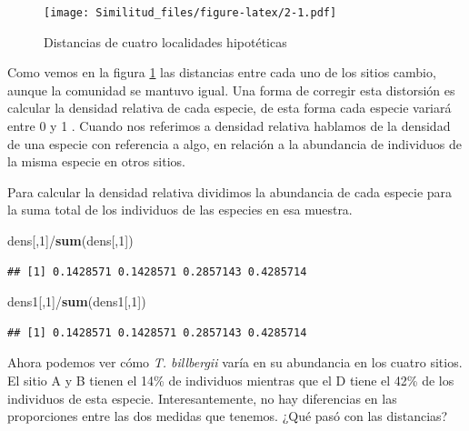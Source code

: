 \documentclass[]{book}
\newenvironment{Shaded}{\begin{snugshade}}{\end{snugshade}}
\newcommand{\KeywordTok}[1]{\textcolor[rgb]{0.13,0.29,0.53}{\textbf{{#1}}}}
\newcommand{\DecValTok}[1]{\textcolor[rgb]{0.00,0.00,0.81}{{#1}}}
\newcommand{\NormalTok}[1]{{#1}}
\begin{document}
\begin{figure}[htbp]
\centering
\texttt{[image: Similitud\_files/figure-latex/2-1.pdf]}
\caption{\label{fig:2}Distancias de cuatro localidades hipotéticas}
\end{figure}

Como vemos en la figura \ref{fig:2} las distancias entre cada uno de los
sitios cambio, aunque la comunidad se mantuvo igual. Una forma de
corregir esta distorsión es calcular la densidad relativa de cada
especie, de esta forma cada especie variará entre 0 y 1
\citep{Stevens2009}. Cuando nos referimos a densidad relativa hablamos
de la densidad de una especie con referencia a algo, en relación a la
abundancia de individuos de la misma especie en otros sitios.

Para calcular la densidad relativa dividimos la abundancia de cada
especie para la suma total de los individuos de las especies en esa
muestra.

\begin{Shaded}
\begin{Highlighting}[]
\NormalTok{dens[,}\DecValTok{1}\NormalTok{]/}\KeywordTok{sum}\NormalTok{(dens[,}\DecValTok{1}\NormalTok{])}
\end{Highlighting}
\end{Shaded}

\begin{verbatim}
## [1] 0.1428571 0.1428571 0.2857143 0.4285714
\end{verbatim}

\begin{Shaded}
\begin{Highlighting}[]
\NormalTok{dens1[,}\DecValTok{1}\NormalTok{]/}\KeywordTok{sum}\NormalTok{(dens1[,}\DecValTok{1}\NormalTok{])}
\end{Highlighting}
\end{Shaded}

\begin{verbatim}
## [1] 0.1428571 0.1428571 0.2857143 0.4285714
\end{verbatim}

Ahora podemos ver cómo \emph{T. billbergii} varía en su abundancia en
los cuatro sitios. El sitio A y B tienen el 14\% de individuos mientras
que el D tiene el 42\% de los individuos de esta especie.
Interesantemente, no hay diferencias en las proporciones entre las dos
medidas que tenemos. ¿Qué pasó con las distancias?
\end{document}

